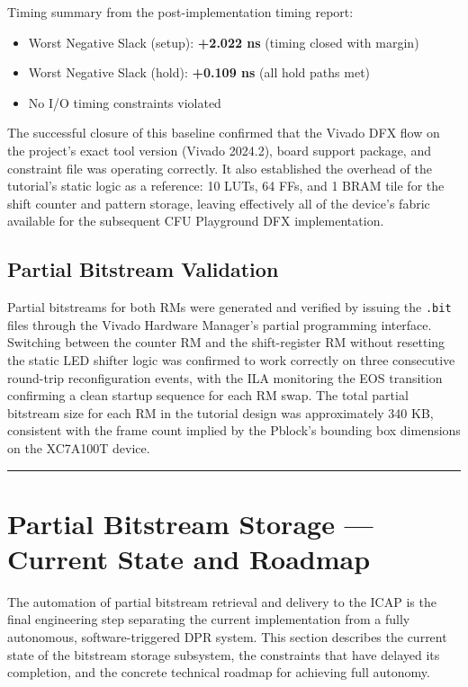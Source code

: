 Timing summary from the post-implementation timing report:

\begin{itemize}
  \item Worst Negative Slack (setup): \textbf{+2.022 ns} (timing closed with margin)
  \item Worst Negative Slack (hold): \textbf{+0.109 ns} (all hold paths met)
  \item No I/O timing constraints violated
\end{itemize}
The successful closure of this baseline confirmed that the Vivado DFX flow on the project's exact tool version (Vivado 2024.2), board support package, and constraint file was operating correctly. It also established the overhead of the tutorial's static logic as a reference: 10 LUTs, 64 FFs, and 1 BRAM tile for the shift counter and pattern storage, leaving effectively all of the device's fabric available for the subsequent CFU Playground DFX implementation.

\subsection{Partial Bitstream Validation}

Partial bitstreams for both RMs were generated and verified by issuing the \texttt{.bit} files through the Vivado Hardware Manager's partial programming interface. Switching between the counter RM and the shift-register RM without resetting the static LED shifter logic was confirmed to work correctly on three consecutive round-trip reconfiguration events, with the ILA monitoring the EOS transition confirming a clean startup sequence for each RM swap. The total partial bitstream size for each RM in the tutorial design was approximately 340 KB, consistent with the frame count implied by the Pblock's bounding box dimensions on the XC7A100T device.

\vspace{0.4em}\hrule\vspace{0.4em}

\section{Partial Bitstream Storage — Current State and Roadmap}

The automation of partial bitstream retrieval and delivery to the ICAP is the final engineering step separating the current implementation from a fully autonomous, software-triggered DPR system. This section describes the current state of the bitstream storage subsystem, the constraints that have delayed its completion, and the concrete technical roadmap for achieving full autonomy.

